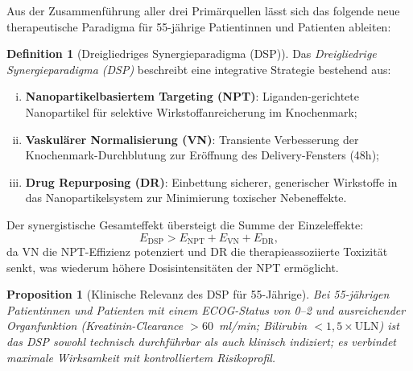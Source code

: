 ﻿\documentclass[12pt,a4paper]{article}
\newtheorem{proposition}[theorem]{Proposition}
\theoremstyle{definition}
\newtheorem{definition}[theorem]{Definition}
\begin{document}
Aus der Zusammenführung aller drei Primärquellen lässt sich das folgende neue
therapeutische Paradigma für 55-jährige Patientinnen und Patienten ableiten:

\begin{definition}[Dreigliedriges Synergieparadigma (DSP)]
  Das \emph{Dreigliedrige Synergieparadigma (DSP)} beschreibt eine integrative
  Strategie bestehend aus:
  \begin{enumerate}[(i)]
    \item \textbf{Nanopartikelbasiertem Targeting (NPT)}: Liganden-gerichtete
          Nanopartikel für selektive Wirkstoffanreicherung im Knochenmark;
    \item \textbf{Vaskulärer Normalisierung (VN)}: Transiente Verbesserung der
          Knochenmark-Durchblutung zur Eröffnung des Delivery-Fensters (48h);
    \item \textbf{Drug Repurposing (DR)}: Einbettung sicherer, generischer
          Wirkstoffe in das Nanopartikelsystem zur Minimierung toxischer
          Nebeneffekte.
  \end{enumerate}
  Der synergistische Gesamteffekt übersteigt die Summe der Einzeleffekte:
  \begin{equation}
    E_{\mathrm{DSP}} > E_{\mathrm{NPT}} + E_{\mathrm{VN}} + E_{\mathrm{DR}},
    \label{eq:synergy}
  \end{equation}
  da VN die NPT-Effizienz potenziert und DR die therapieassoziierte Toxizität
  senkt, was wiederum höhere Dosisintensitäten der NPT ermöglicht.
\end{definition}

\begin{proposition}[Klinische Relevanz des DSP für 55-Jährige]
  Bei 55-jährigen Patientinnen und Patienten mit einem ECOG-Status von 0--2 und
  ausreichender Organfunktion (Kreatinin-Clearance $>60$~ml/min; Bilirubin
  $<1{,}5 \times \mathrm{ULN}$) ist das DSP sowohl technisch durchführbar als auch
  klinisch indiziert; es verbindet maximale Wirksamkeit mit kontrolliertem
  Risikoprofil.
\end{proposition}
\end{document}
